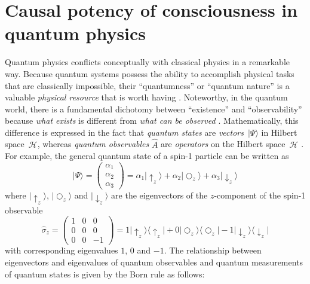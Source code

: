 \documentclass{ws-ijmpb}
\begin{document}
\section{Causal potency of consciousness in quantum physics}
\label{sec:4}

Quantum physics conflicts conceptually with classical physics in a remarkable way.
Because quantum systems possess the ability to accomplish physical tasks that are classically impossible,
their ``quantumness'' or ``quantum nature'' is a valuable \emph{physical resource} that is worth having \cite{Georgiev2022b,Georgiev2022c}.
Noteworthy, in the quantum world, there is a fundamental dichotomy between ``existence''
and ``observability'' because \emph{what exists} is different
from \emph{what can be observed} \cite{Georgiev2017,Georgiev2020a,Georgiev2020b}.
Mathematically, this difference is expressed in the fact that \emph{quantum
states} are \emph{vectors}~$\vert\Psi\rangle$ in Hilbert space~$\mathcal{H}$,
whereas \emph{quantum observables} $\hat{A}$ are \emph{operators}
on the Hilbert space~$\mathcal{H}$ \cite{Dirac1967,Susskind2014,vonNeumann1932,vonNeumann1955,Bhaumik2020}.
For example, the general quantum
state of a spin-1 particle can be written as
\begin{equation}
\vert\Psi\rangle=\left(\begin{array}{c}
\alpha_{1}\\
\alpha_{2}\\
\alpha_{3}
\end{array}\right)=\alpha_{1}\vert\uparrow_{z}\rangle+\alpha_{2}\vert \bigcirc_{z}\rangle+\alpha_{3}\vert \downarrow_{z}\rangle
\end{equation}
where $\vert \uparrow_{z}\rangle$, $\vert \bigcirc_{z}\rangle$ and $\vert \downarrow_{z}\rangle$
are the eigenvectors of the $z$-component of the spin-1 observable
\begin{equation}
\hat{\sigma}_{z}=\left(\begin{array}{ccc}
1 & 0 & 0\\
0 & 0 & 0\\
0 & 0 & -1
\end{array}\right)=1\vert \uparrow_{z}\rangle\langle\uparrow_{z}\vert +0\vert \bigcirc_{z}\rangle\langle\bigcirc_{z}\vert -1\vert \downarrow_{z}\rangle\langle\downarrow_{z}\vert 
\end{equation}
with corresponding eigenvalues $1$, 0 and $-1$. The relationship
between eigenvectors and eigenvalues of quantum observables and quantum
measurements of quantum states is given by the Born rule \cite{Born1955,Vaidman2020} as follows:
\end{document}
